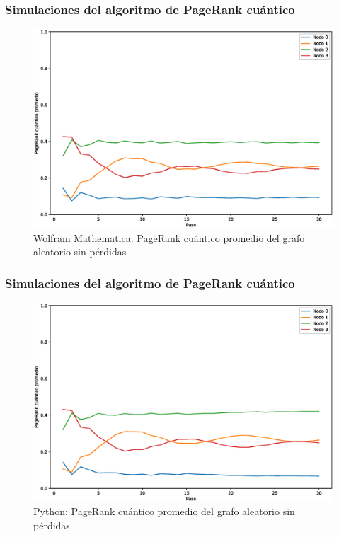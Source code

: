 \documentclass[xetex,mathserif,serif, 8pt]{beamer}
\begin{document}
\begin{frame}
    \frametitle{Simulaciones del algoritmo de PageRank cuántico}

    \begin{figure}[H]
        \centering
        \includegraphics[width=0.9\linewidth]{img/any-mean-M.eps}
        \caption{Wolfram Mathematica: PageRank cuántico promedio del grafo aleatorio sin pérdidas}
    \end{figure}

\end{frame}

\begin{frame}
    \frametitle{Simulaciones del algoritmo de PageRank cuántico}

    \begin{figure}[H]
        \centering
        \includegraphics[width=0.9\linewidth]{img/any-mean-lossless.eps}
        \caption{Python: PageRank cuántico promedio del grafo aleatorio sin pérdidas}
    \end{figure}

\end{frame}
\end{document}
